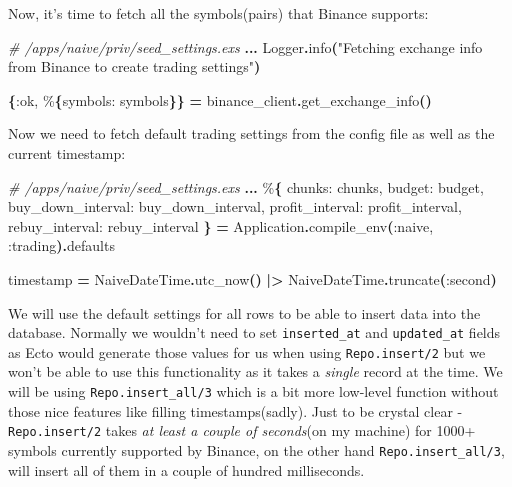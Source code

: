 \documentclass[
  oneside]{book}
\newenvironment{Shaded}{\begin{snugshade}}{\end{snugshade}}
\newcommand{\CommentTok}[1]{\textcolor[rgb]{0.56,0.35,0.01}{\textit{#1}}}
\newcommand{\ConstantTok}[1]{\textcolor[rgb]{0.56,0.35,0.01}{#1}}
\newcommand{\FunctionTok}[1]{\textcolor[rgb]{0.13,0.29,0.53}{\textbf{#1}}}
\newcommand{\NormalTok}[1]{#1}
\newcommand{\OperatorTok}[1]{\textcolor[rgb]{0.81,0.36,0.00}{\textbf{#1}}}
\newcommand{\StringTok}[1]{\textcolor[rgb]{0.31,0.60,0.02}{#1}}
\newcommand{\VariableTok}[1]{\textcolor[rgb]{0.00,0.00,0.00}{#1}}
\begin{document}
Now, it's time to fetch all the symbols(pairs) that Binance supports:

\begin{Shaded}
\begin{Highlighting}[]
\CommentTok{\# /apps/naive/priv/seed\_settings.exs}
\OperatorTok{...}
\ConstantTok{Logger}\OperatorTok{.}\NormalTok{info}\FunctionTok{(}\StringTok{"Fetching exchange info from Binance to create trading settings"}\FunctionTok{)}

\FunctionTok{\{}\VariableTok{:ok}\NormalTok{, \%}\FunctionTok{\{}\VariableTok{symbols:}\NormalTok{ symbols}\FunctionTok{\}\}} \OperatorTok{=}\NormalTok{ binance\_client}\OperatorTok{.}\NormalTok{get\_exchange\_info}\FunctionTok{()}
\end{Highlighting}
\end{Shaded}

Now we need to fetch default trading settings from the config file as well as the current timestamp:

\begin{Shaded}
\begin{Highlighting}[]
\CommentTok{\# /apps/naive/priv/seed\_settings.exs}
\OperatorTok{...}
\NormalTok{\%}\FunctionTok{\{}
  \VariableTok{chunks:}\NormalTok{ chunks,}
  \VariableTok{budget:}\NormalTok{ budget,}
  \VariableTok{buy\_down\_interval:}\NormalTok{ buy\_down\_interval,}
  \VariableTok{profit\_interval:}\NormalTok{ profit\_interval,}
  \VariableTok{rebuy\_interval:}\NormalTok{ rebuy\_interval}
\FunctionTok{\}} \OperatorTok{=} \ConstantTok{Application}\OperatorTok{.}\NormalTok{compile\_env}\FunctionTok{(}\VariableTok{:naive}\NormalTok{, }\VariableTok{:trading}\FunctionTok{)}\OperatorTok{.}\NormalTok{defaults}

\NormalTok{timestamp }\OperatorTok{=} \ConstantTok{NaiveDateTime}\OperatorTok{.}\NormalTok{utc\_now}\FunctionTok{()}
  \OperatorTok{|\textgreater{}} \ConstantTok{NaiveDateTime}\OperatorTok{.}\NormalTok{truncate}\FunctionTok{(}\VariableTok{:second}\FunctionTok{)}
\end{Highlighting}
\end{Shaded}

We will use the default settings for all rows to be able to insert data into the database. Normally we wouldn't need to set \texttt{inserted\_at} and \texttt{updated\_at} fields as Ecto would generate those values for us when using \texttt{Repo.insert/2} but we won't be able to use this functionality as it takes a \emph{single} record at the time. We will be using \texttt{Repo.insert\_all/3} which is a bit more low-level function without those nice features like filling timestamps(sadly). Just to be crystal clear - \texttt{Repo.insert/2} takes \emph{at least a couple of seconds}(on my machine) for 1000+ symbols currently supported by Binance, on the other hand \texttt{Repo.insert\_all/3}, will insert all of them in a couple of hundred milliseconds.
\end{document}
